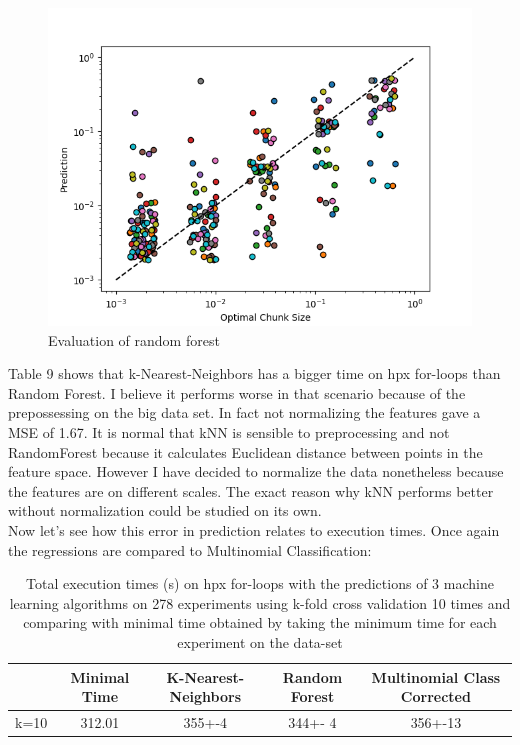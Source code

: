 \begin{figure}[H]
	\centering
	\includegraphics[width=120mm]{images/RFR_eval_big.png}
	\caption{Evaluation of random forest}
\end{figure}

Table 9 shows that k-Nearest-Neighbors has a bigger time on hpx for-loops than Random Forest. I believe it performs worse in that scenario because of the prepossessing on the big data set. In fact not normalizing the features gave a MSE of 1.67. It is normal that kNN is sensible to preprocessing and not RandomForest because it calculates Euclidean distance between points in the feature space. However I have decided to normalize the data nonetheless because the features are on different scales. The exact reason why kNN performs better without normalization could be studied on its own.
\\

Now let's see how this error in prediction relates to execution times. Once again the regressions are compared to Multinomial Classification:


\begin{table}[h]
	\centering
	\caption{Total execution times (s) on hpx for-loops with the predictions of 3 machine learning algorithms on 278 experiments using k-fold cross validation 10 times and comparing with minimal time obtained by taking the minimum time for each experiment on the data-set}
	\label{my-label}
	\begin{tabular}{|c|c|c|c|c|}
		\hline
		& Minimal Time&K-Nearest-Neighbors & Random Forest &Multinomial Class Corrected\\ \hline
		k=10  &312.01&
		 355+-4        & 344+- 4&356+-13 \\ \hline
	\end{tabular}
\end{table}

